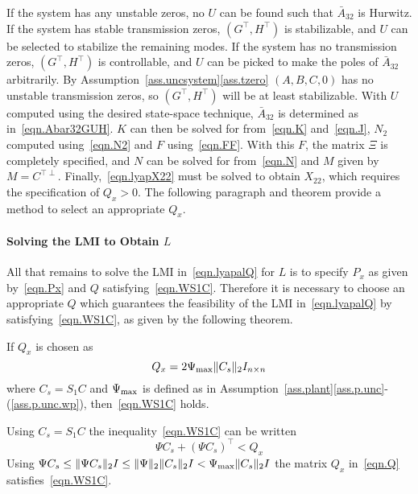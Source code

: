 If the system has any unstable zeros, no $U$ can be found such that $\bar{A}_{32}$ is Hurwitz.
If the system has stable transmission zeros, $(G^{\top},H^{\top})$ is stabilizable, and $U$ can be selected to stabilize the remaining modes.
If the system has no transmission zeros, $(G^{\top},H^{\top})$ is controllable, and $U$ can be picked to make the poles of $\bar{A}_{32}$ arbitrarily.
By Assumption~\ref{ass.uncsystem}\ref{ass.tzero} $(A,B,C,0)$ has no unstable transmission zeros, so $(G^{\top},H^{\top})$ will be at least stabilizable.
With $U$ computed using the desired state-space technique, $\bar{A}_{32}$ is determined as in\ \eqref{eqn.Abar32GUH}.
$K$ can then be solved for from\ \eqref{eqn.K} and\ \eqref{eqn.J}, $N_{2}$ computed using\ \eqref{eqn.N2} and $F$ using\ \eqref{eqn.FF}.
With this $F$, the matrix $\Xi$ is completely specified, and $N$ can be solved for from\ \eqref{eqn.N} and $M$ given by $M=C^{\top\perp}$.
Finally,\ \eqref{eqn.lyapX22} must be solved to obtain $X_{22}$, which requires the specification of $Q_{x}>0$.
The following paragraph and theorem provide a method to select an appropriate $Q_{x}$.

\paragraph{Solving the LMI to Obtain $L$}

All that remains to solve the LMI in\ \eqref{eqn.lyapalQ} for $L$ is to specify $P_{x}$ as given by\ \eqref{eqn.Px} and $Q$ satisfying\ \eqref{eqn.WS1C}.
Therefore it is necessary to choose an appropriate $Q$ which guarantees the feasibility of the LMI in\ \eqref{eqn.lyapalQ} by satisfying\ \eqref{eqn.WS1C}, as given by the following theorem.

\begin{thm-dan}
  If $Q_{x}$ is chosen as
  \begin{equation}
    \label{eqn.Q}
    Q_{x}=2\Psi_{\rm{\max}}\|C_{s}\|_{2}I_{n\times n}
  \end{equation}
  where $C_{s}=S_{1}C$ and $\Psi_{\rm{\max}}$ is defined as in Assumption~\ref{ass.plant}\ref{ass.p.unc}-(\ref{ass.p.unc.wp}), then\ \eqref{eqn.WS1C} holds.
\end{thm-dan}

\begin{proof-dan}
  Using $C_{s}=S_{1}C$ the inequality\ \eqref{eqn.WS1C} can be written
  \begin{equation*}
    \Psi C_{s}+(\Psi C_{s})^{\top}<Q_{x}
  \end{equation*}
  Using $\Psi C_{s}\leq\|\Psi C_{s}\|_{2}I\leq\|\Psi\|_{2}\|C_{s}\|_{2}I<\Psi_{\rm{\max}}\|C_{s}\|_{2}I$ the matrix $Q_{x}$ in\ \eqref{eqn.Q} satisfies\ \eqref{eqn.WS1C}.
\end{proof-dan}

